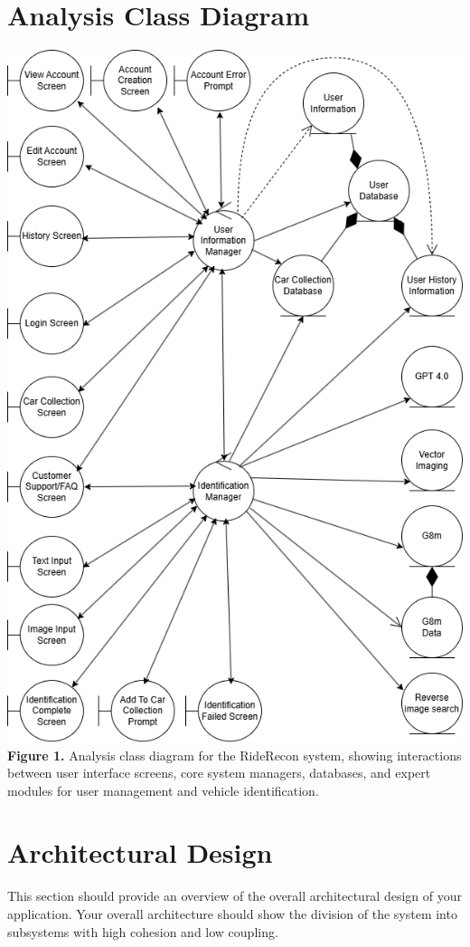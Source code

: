 \documentclass[]{article}
\begin{document}
\section{Analysis Class Diagram}
\label{sec:analysis_class_diagram}
\begin{center}
	\includegraphics[scale=0.5]{images/AnalysisDiagram_compacted.png}\\
	\textbf{Figure 1.} Analysis class diagram for the RideRecon system, showing interactions between user interface screens, core system managers, databases, and expert modules for user management and vehicle identification.
\end{center}


\section{Architectural Design}
\label{sec:architectural_design}
This section should provide an overview of the overall architectural design of your application. Your overall architecture should show the division of the system into subsystems with high cohesion and low coupling.
\end{document}

